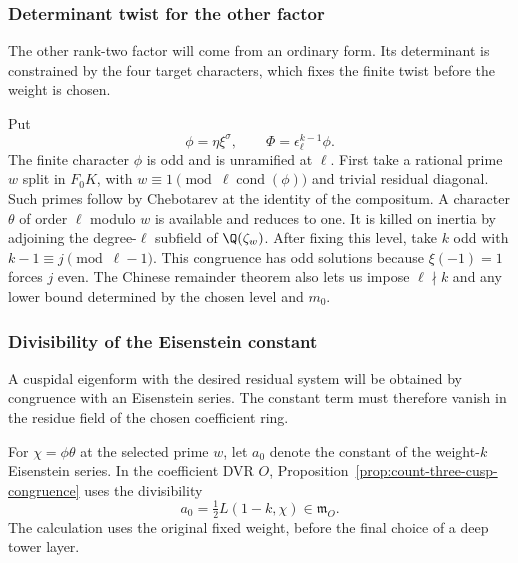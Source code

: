 \subsubsection{Determinant twist for the other factor}

The other rank-two factor will come from an ordinary form. Its determinant is constrained by the four target characters, which fixes the finite twist before the weight is chosen.

Put
\[
             \phi=\eta\xi^\sigma,\qquad
             \Phi=\epsilon_\ell^{k-1}\phi .
\]
The finite character \(\phi\) is odd and is unramified
at \(\ell\). First take a rational prime \(w\) split in \(F_0K\), with
\(w\equiv1\pmod{\ell\operatorname{cond}(\phi)}\) and trivial
residual diagonal. Such primes follow by Chebotarev at the
identity of the compositum. A character \(\theta\) of order
\(\ell\) modulo \(w\) is available and reduces to one.
It is killed on inertia by adjoining the degree-\(\ell\)
subfield of \(\Q(\zeta_w)\).
After fixing this level, take \(k\) odd with
\(k-1\equiv j\pmod{\ell-1}\).
This congruence has odd solutions because \(\xi(-1)=1\)
forces \(j\) even. The Chinese remainder theorem
also lets us impose \(\ell\nmid k\) and any lower
bound determined by the chosen level and \(m_0\).

\subsubsection{Divisibility of the Eisenstein constant}

A cuspidal eigenform with the desired residual system will be obtained by congruence with an Eisenstein series. The constant term must therefore vanish in the residue field of the chosen coefficient ring.

\begin{proposition}\label{prop:count-three-small-constant}
For \(\chi=\phi\theta\) at the selected prime \(w\), let \(a_0\) denote the constant of the weight-\(k\) Eisenstein series. In the coefficient DVR \(O\), Proposition~\ref{prop:count-three-cusp-congruence} uses the divisibility 
\[
 a_0=\tfrac12 L(1-k,\chi)\in\mathfrak m_O.
\]
 The calculation
uses the original fixed weight, before the final choice of a deep
tower layer.
\end{proposition}

